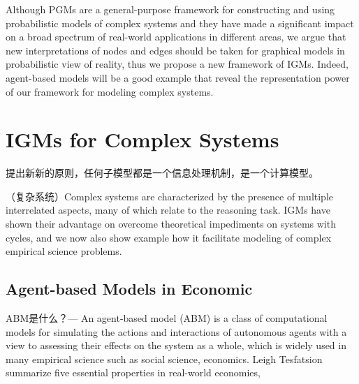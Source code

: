 \documentclass{article}
\theoremstyle{definition}
\theoremstyle{remark}
\theoremstyle{definition}
\begin{document}
\begin{CJK*}{UTF8}{gbsn}
Although PGMs are a general-purpose framework for constructing and using probabilistic models of complex systems and they have made a significant impact on a broad spectrum of real-world applications in different areas, we argue that new interpretations of nodes and edges should be taken for graphical models in probabilistic view of reality, thus we propose a new framework of IGMs. Indeed, agent-based models will be a good example that reveal the representation power of our framework for modeling complex systems.



\section{IGMs for Complex Systems}

提出新新的原则，任何子模型都是一个信息处理机制，是一个计算模型。


（复杂系统）Complex systems are characterized by the presence of multiple interrelated aspects, many of which relate to the reasoning task. 
IGMs have shown their advantage on overcome theoretical impediments on systems with cycles, and we now also show example how it facilitate modeling of complex empirical science problems.

\subsection{Agent-based Models in Economic}

ABM是什么？---
An agent-based model (ABM)
is a class of computational models for simulating the actions and interactions of autonomous agents with a view to assessing their effects on the system as a whole, which is widely used in many empirical science such as social science, economics. Leigh Tesfatsion summarize five essential properties in real-world economies, 


\end{CJK*}
\end{document}
